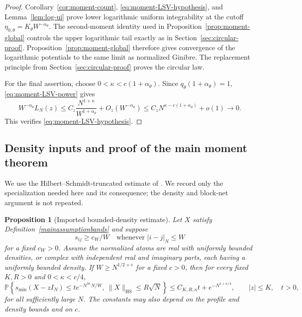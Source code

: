 \documentclass[11pt,reqno]{amsart}
\numberwithin{equation}{section}
\theoremstyle{plain}
\newtheorem{proposition}[theorem]{Proposition}
\theoremstyle{definition}
\theoremstyle{remark}
\begin{document}
\begin{proof}
Corollary~\ref{cor:moment-count},
\eqref{eq:moment-LSV-hypothesis}, and Lemma~\ref{lem:log-ui} prove
lower logarithmic uniform integrability at the cutoff
$\eta_{0,\theta}=K_\theta W^{-\alpha_\theta}$.
The second-moment identity used in Proposition~\ref{prop:moment-global}
controls the upper logarithmic tail exactly as in
Section~\ref{sec:circular-proof}.  Proposition~\ref{prop:moment-global}
therefore gives convergence of the logarithmic potentials to the same
limit as normalized Ginibre.  The replacement principle from
Section~\ref{sec:circular-proof} proves the circular law.

For the final assertion, choose $0<\kappa<c(1+\alpha_\theta)$.  Since
$q_\theta(1+\alpha_\theta)=1$, \eqref{eq:moment-LSV-power} gives
\[
 W^{-\alpha_\theta}L_N(z)
 \le C_z\frac{N^{1+\kappa}}{W^{1+\alpha_\theta}}
       +O_z(W^{-\alpha_\theta})
 \le C_zN^{\kappa-c(1+\alpha_\theta)}+o(1)\longrightarrow0.
\]
This verifies \eqref{eq:moment-LSV-hypothesis}.
\end{proof}

\subsection{Density inputs and proof of the main moment theorem}\label{sec:standalone-lsv}

We use the Hilbert--Schmidt-truncated estimate of
\cite[Theorem~3.1, proved in Appendix~B]{han2026optimal}.
We record only the specialization needed here and its consequence;
the density and block-net argument is not repeated.

\begin{proposition}[Imported bounded-density estimate]
\label{newleastsingularvaluebound}
Let $X$ satisfy Definition~\ref{mainassumptionbands} and suppose
\begin{equation}\label{lowerboundsonvariances}
 s_{ij}\ge c_W/W\quad\text{whenever }|i-j|_N\le W
\end{equation}
for a fixed $c_W>0$. Assume the normalized atoms are real with uniformly
bounded densities, or complex with independent real and imaginary parts,
each having a uniformly bounded density. If $W\ge N^{1/2+c}$ for a
fixed $c>0$, then for every fixed $K,R>0$ and $0<\kappa<c/4$,
\begin{equation}\label{eq:standalone-lsv}
 \mathbb P\left\{s_{\min}(X-zI_N)
 \le t e^{-N^{3\kappa}N/W},\ \|X\|_{\mathrm{HS}}\le R\sqrt N\right\}
 \le C_{K,R,\kappa}t+e^{-N^{1+\kappa/4}},
 \qquad |z|\le K,\quad t>0,
\end{equation}
for all sufficiently large $N$. The constants may also depend on the
profile and density bounds and on $c$.
\end{proposition}
\end{document}
